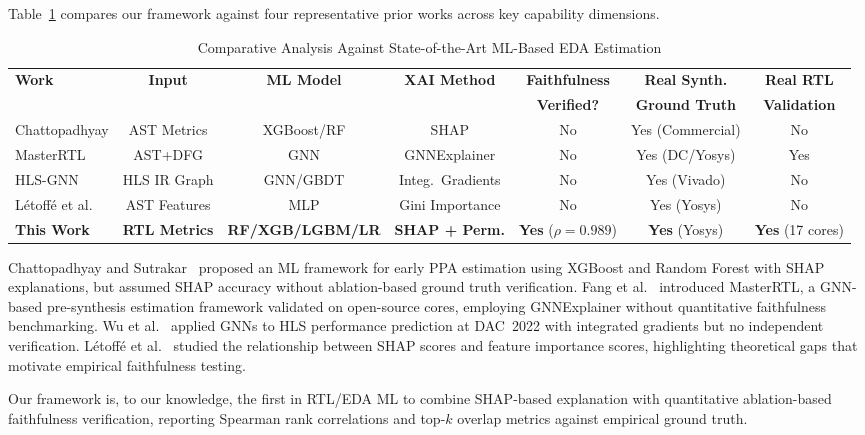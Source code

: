 \documentclass[conference]{IEEEtran}
\begin{document}
Table~\ref{tab:related_work} compares our framework against four
representative prior works across key capability dimensions.

\begin{table}[t]
\centering
\caption{Comparative Analysis Against State-of-the-Art ML-Based EDA Estimation}
\label{tab:related_work}
\small
\begin{tabular}{@{}lcccccc@{}}
\toprule
\textbf{Work} & \textbf{Input} & \textbf{ML Model} & \textbf{XAI Method} & \textbf{Faithfulness} & \textbf{Real Synth.} & \textbf{Real RTL} \\
 &  &  &  & \textbf{Verified?} & \textbf{Ground Truth} & \textbf{Validation} \\
\midrule
Chattopadhyay \cite{chattopadhyay2025mlframework} & AST Metrics & XGBoost/RF & SHAP & No & Yes (Commercial) & No \\
MasterRTL \cite{fang2023masterrtl} & AST+DFG & GNN & GNNExplainer & No & Yes (DC/Yosys) & Yes \\
HLS-GNN \cite{wu2022hls} & HLS IR Graph & GNN/GBDT & Integ.\ Gradients & No & Yes (Vivado) & No \\
L\'{e}toff\'{e} et al.\ \cite{letoffe2024shapscores} & AST Features & MLP & Gini Importance & No & Yes (Yosys) & No \\
\midrule
\textbf{This Work} & \textbf{RTL Metrics} & \textbf{RF/XGB/LGBM/LR} & \textbf{SHAP + Perm.} & \textbf{Yes} ($\rho{=}0.989$) & \textbf{Yes} (Yosys) & \textbf{Yes} (17 cores) \\
\bottomrule
\end{tabular}
\end{table}

Chattopadhyay and Sutrakar~\cite{chattopadhyay2025mlframework} proposed an
ML framework for early PPA estimation using XGBoost and Random Forest with
SHAP explanations, but assumed SHAP accuracy without ablation-based ground
truth verification. Fang et al.~\cite{fang2023masterrtl} introduced
MasterRTL, a GNN-based pre-synthesis estimation framework validated on
open-source cores, employing GNNExplainer without quantitative faithfulness
benchmarking. Wu et al.~\cite{wu2022hls} applied GNNs to HLS performance
prediction at DAC~2022 with integrated gradients but no independent
verification. L\'{e}toff\'{e} et al.~\cite{letoffe2024shapscores} studied
the relationship between SHAP scores and feature importance scores,
highlighting theoretical gaps that motivate empirical faithfulness testing.

Our framework is, to our knowledge, the first in RTL/EDA ML to combine
SHAP-based explanation with quantitative ablation-based faithfulness
verification, reporting Spearman rank correlations and top-$k$ overlap
metrics against empirical ground truth.
\end{document}
